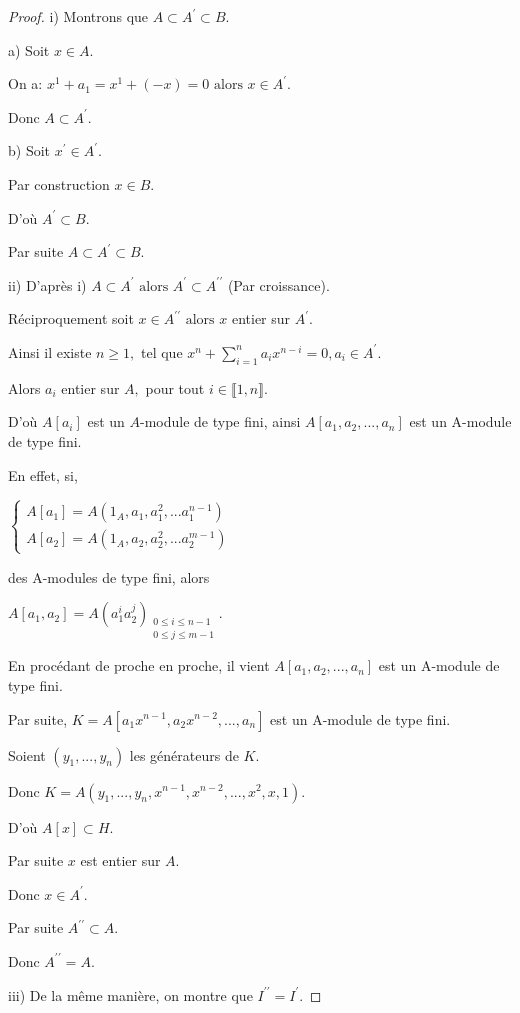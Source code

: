 \begin{proof}
	i) Montrons que $A\subset A^{\prime }\subset B$.
	
	a) Soit $x\in A.$
	
	On a: $x^{1}+a_{1}=x^{1}+(-x)=0\text{ alors } x\in A^{\prime }.$
	
	Donc $A\subset A^{\prime }.$
	
	b) Soit $x^{\prime }\in A^{\prime }.$ 
	
	Par construction $x\in B.$
	
	D'où $A^{\prime }\subset B.$
	
	Par suite $A \subset A^{\prime }\subset B$.
	
	ii) D'après i) $A\subset A^{\prime }\text{ alors } A^{\prime }\subset
	A^{\prime \prime }$ (Par croissance).
	
	Réciproquement soit $x\in A^{\prime \prime }\text{ alors } x$ entier sur $
	A^{\prime }$.
	
	Ainsi il existe $n\geq 1,$ tel que  $x^{n}+\sum
	\limits_{i=1}^{n}a_{i}x^{n-i}=0,a_{i}\in A^{\prime }.$
	
	Alors $a_{i}$ entier sur $A,$ pour tout $i\in \llbracket 1, n \rrbracket.$
	
	D'où $A[a_{i}]$ est un $A$-module de type fini, ainsi $A[a_{1},a_{2},...,a_{n}]$ est un A-module de type fini.
	
	En effet, si,
	
	$\left\{ 
	\begin{array}{c}
		A[a_{1}]=A(1_{A},a_{1},a_{1}^{2},...a_{1}^{n-1}) \\ 
		A[a_{2}]=A(1_{A},a_{2},a_{2}^{2},...a_{2}^{m-1})
	\end{array}
	\right. $
	
	des A-modules de type fini, alors 
	
	$A[a_{1},a_{2}]=A(a_{1}^{i}a_{2}^{j})_{\substack{ 0\leq i\leq n-1 \\ 0\leq
			j\leq m-1}}$.
	
	En procédant de proche en proche, il vient $A[a_{1},a_{2},...,a_{n}]$
	est un A-module de type fini.
	
	Par suite, $K=A[a_{1}x^{n-1},a_{2}x^{n-2},...,a_{n}]$ est un A-module de
	type fini.
	
	Soient $(y_{1},...,y_{n})$ les générateurs de $K.$
	
	Donc $K=A(y_{1},...,y_{n},x^{n-1},x^{n-2},...,x^{2},x,1)$.
	
	D'où $A[x]\subset H.$
	
	Par suite $x$ est entier sur $A$.
	
	Donc $x\in A^{\prime }$.
	
	Par suite $A^{\prime \prime }\subset A$.
	
	Donc  $A^{\prime \prime }=A$.
	
	iii) De la même manière, on montre que $I^{\prime \prime }=I^{\prime}.$
\end{proof}
